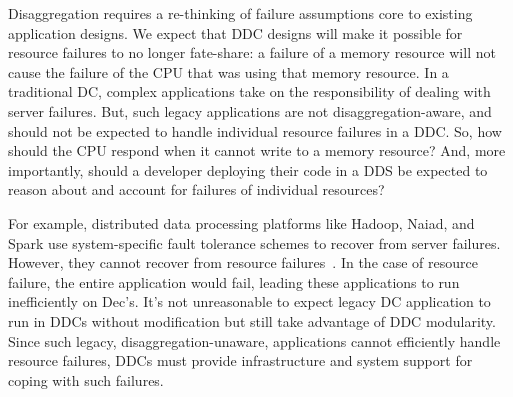 Disaggregation requires a re-thinking of failure assumptions core to
existing application designs. We expect that DDC designs will make it
possible for resource failures to no longer fate-share: a failure of a
memory resource will not cause the failure of the CPU that was using
that memory resource. In a traditional DC, complex applications take
on the responsibility of dealing with server failures. But, such
legacy applications are not disaggregation-aware, and should not be
expected to handle individual resource failures in a DDC. So, how
should the CPU respond when it cannot write to a memory resource? And,
more importantly, should a developer deploying their code in a DDS be
expected to reason about and account for failures of individual
resources?

For example, distributed data processing platforms like Hadoop, Naiad,
and Spark use system-specific fault tolerance schemes to recover from
server failures. However, %
they cannot recover from resource
failures~\cite{Dean2004,Murray2013,Zaharia2012}. In the case of resource
failure, the entire application would fail, leading these applications to
run inefficiently on Dec's. It's not unreasonable
to expect legacy DC application to run in DDCs without modification but still
take advantage of DDC modularity.
Since such legacy, disaggregation-unaware, applications cannot efficiently handle
resource failures, DDCs must provide infrastructure and system support
for coping with such failures.





